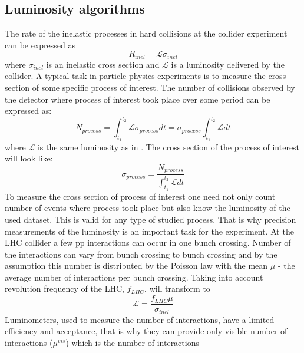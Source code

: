 \subsection{Luminosity algorithms}
The rate of the inelastic processes in hard collisions at the collider experiment can be expressed as
\begin{equation}
R_{inel} = \mathscr{L} \sigma_{inel}
\label{eq:simpleLumi}
\end{equation}
where $\sigma_{inel}$ is an inelastic cross section and $\mathscr{L}$ is a luminosity delivered by the collider.
A typical task in particle physics experiments is to measure the cross section of some specific process of interest.
The number of collisions observed by the detector where process of interest took place over some period can be expressed as:
\begin{equation}
N_{process} = \int_{t_{1}}^{t_{2}} \mathscr{L} \sigma_{process} dt = \sigma_{process} \int_{t_{1}}^{t_{2}} \mathscr{L} dt
\label{eq:simpleLumi2}
\end{equation}
where $\mathscr{L}$ is the same luminosity as in .
The cross section of the process of interest will look like:
\begin{equation}
\sigma_{process} = \dfrac{N_{process}}{  \int_{t_{1}}^{t_{2}} \mathscr{L} dt}
\label{eq:sigma_proc}
\end{equation}
To measure the cross section of process of interest one need not only count number of events where process took place but also know the luminosity of the used dataset.
This is valid for any type of studied process. 
That is why precision measurements of the luminosity is an important task for the experiment.
At the LHC collider a few pp interactions can occur in one bunch crossing. Number of the interactions can vary from bunch crossing to bunch crossing and by the assumption this number is distributed by the Poisson law with the mean $\mu$ - the average number of interactions per bunch crossing.
Taking into account revolution frequency of the LHC, $f_{LHC}$,  will transform to
\begin{equation}
\mathscr{L} = \dfrac{f_{LHC} \mu}{\sigma_{inel}}
\label{eq:lumi_average_mu}
\end{equation}
Luminometers, used to measure the number of interactions, have a limited efficiency and acceptance, 
that is why they can provide only visible number of interactions ($\mu^{vis}$) which is the number of interactions 
